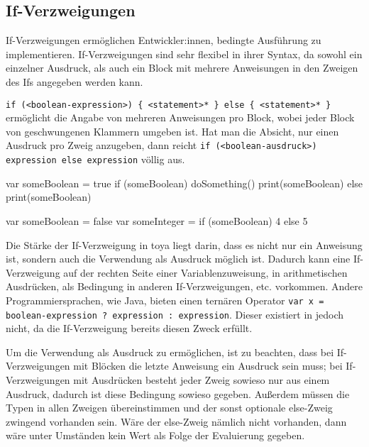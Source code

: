 \subsection{If-Verzweigungen}

If-Verzweigungen ermöglichen Entwickler:innen, bedingte Ausführung zu implementieren. If-Verzweigungen sind sehr flexibel in ihrer Syntax, da sowohl ein einzelner Ausdruck, als auch ein Block mit mehrere Anweisungen in den Zweigen des Ifs angegeben werden kann. 

\texttt{if (<boolean-expression>) \{ <statement>* \} else \{ <statement>* \}} ermöglicht die Angabe von mehreren Anweisungen pro Block, wobei jeder Block von geschwungenen Klammern umgeben ist. Hat man die Absicht, nur einen Ausdruck pro Zweig anzugeben, dann reicht \texttt{if (<boolean-ausdruck>) expression else expression} völlig aus.

\begin{ToyaCode}[numbers=none, caption={If-Verzweigung als klassische Anweisung.}]
var someBoolean = true
if (someBoolean) {
    doSomething()
    print(someBoolean)
} else {
    print(someBoolean)
}
\end{ToyaCode}

\begin{ToyaCode}[numbers=none, caption={If-Verzweigung als Ausdruck in einer Variablenzuweisung.}]
var someBoolean = false
var someInteger = if (someBoolean) 4 else 5
\end{ToyaCode}

Die Stärke der If-Verzweigung in toya liegt darin, dass es nicht nur ein Anweisung ist, sondern auch die Verwendung als Ausdruck möglich ist. Dadurch kann eine If-Verzweigung auf der rechten Seite einer Variablenzuweisung, in arithmetischen Ausdrücken, als Bedingung in anderen If-Verzweigungen, etc. vorkommen. Andere Programmiersprachen, wie Java, bieten einen ternären Operator \texttt{var x = boolean-expression ? expression : expression}. Dieser existiert in \toya jedoch nicht, da die If-Verzweigung bereits diesen Zweck erfüllt. 


Um die Verwendung als Ausdruck zu ermöglichen, ist zu beachten, dass bei If-Verzweigungen mit Blöcken die letzte Anweisung ein Ausdruck sein muss; bei If-Verzweigungen mit Ausdrücken besteht jeder Zweig sowieso nur aus einem Ausdruck, dadurch ist diese Bedingung sowieso gegeben. Außerdem müssen die Typen in allen Zweigen übereinstimmen und der sonst optionale else-Zweig zwingend vorhanden sein. Wäre der else-Zweig nämlich nicht vorhanden, dann wäre unter Umständen kein Wert als Folge der Evaluierung gegeben.

